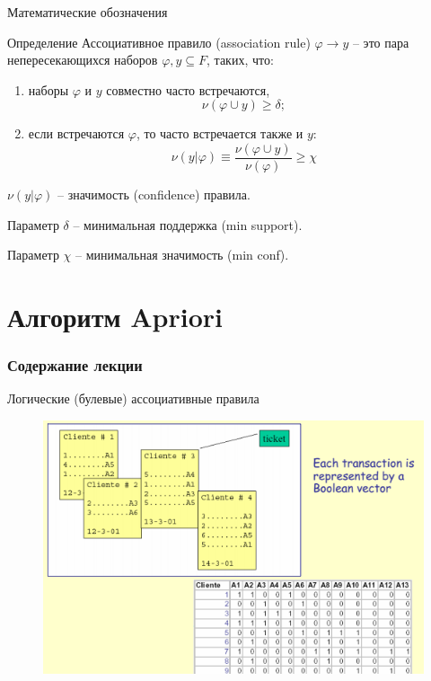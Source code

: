 \documentclass{beamer}
\begin{document}
\begin{frame}{Математические обозначения}
	\begin{block}{Определение}
		Ассоциативное правило (association rule) $\varphi \rightarrow y$ -- это пара непересекающихся наборов $\varphi, y \subseteq F$, таких, что:
		\begin{enumerate}
			\item наборы $\varphi$ и $y$ совместно часто встречаются,
			\[\nu(\varphi \cup y) \geq \delta; \]
			\item если встречаются $\varphi$, то часто встречается также и $y$:
			\[\nu(y | \varphi) \equiv \frac{\nu(\varphi \cup y)}{\nu(\varphi)} \geq \chi\]		
		\end{enumerate}
	\end{block}
	
	$\nu(y | \varphi)$ -- значимость (confidence) правила.
	
	Параметр $\delta$ -- минимальная поддержка (min support).

	Параметр $\chi$ -- минимальная значимость (min conf).
\end{frame}

\section{Алгоритм Apriori}

\begin{frame}
  \frametitle{Содержание лекции}
  \tableofcontents[current]
\end{frame}

\begin{frame}{Логические (булевые) ассоциативные правила}
	\begin{figure}[h]
		\centering
		\includegraphics[scale=0.75]{images/lec08-pic07.png}
	\end{figure}
\end{frame}
\end{document}
